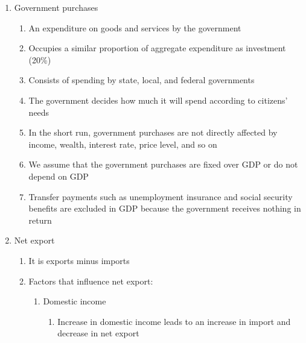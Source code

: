\documentclass[12pt]{article}
\begin{document}
\begin{enumerate}
      \item Government purchases

        \begin{enumerate}

          \item An expenditure on goods and services by the government

          \item Occupies a similar proportion of aggregate expenditure as investment (20\%)

          \item Consists of spending by state, local, and federal governments

          \item The government decides how much it will spend according to citizens' needs

          \item In the short run, government purchases are not directly affected by income, wealth, interest rate, price level, and so on

          \item We assume that the government purchases are fixed over GDP or do not depend on GDP

          \item Transfer payments such as unemployment insurance and social security benefits are excluded in GDP because the government receives nothing in return

        \end{enumerate}

      \item Net export

        \begin{enumerate}

          \item It is exports minus imports

          \item Factors that influence net export:

            \begin{enumerate}

              \item Domestic income

                \begin{enumerate}

                  \item Increase in domestic income leads to an increase in import and decrease in net export


\end{enumerate}
\end{enumerate}
\end{enumerate}
\end{enumerate}
\end{document}
